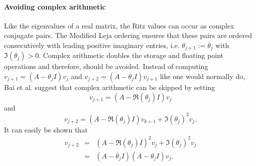 \documentclass{scrartcl}
\numberwithin{equation}{section}
\begin{document}
\paragraph{Avoiding complex arithmetic} \label{sec:avoid_compl_arithm}
Like the eigenvalues of a real matrix, the Ritz values can occur as complex conjugate pairs. The Modified Leja ordering ensures that these pairs are ordered consecutively with leading positive imaginary entries, i.e. $\theta_{j + 1} := \overline{\theta}_j$ with $\Im(\theta_j) > 0$. Complex arithmetic doubles the storage and floating point operations and therefore, should be avoided. Instead of computing $v_{j + 1} = (A - \theta_j I)v_j$ and $v_{j + 2} = (A - \overline{\theta}_j I)v_{j + 1}$ like one would normally do, Bai et al. \cite{doi:10.1093/imanum/NewtonGMRES_bai} suggest that complex arithmetic can be skipped by setting
\begin{equation}
v_{j + 1} = (A - \Re(\theta_j) I )v_j
\end{equation}
and
\begin{equation}
v_{j + 2} = (A - \Re(\theta_j) I )v_{k + 1} + \Im(\theta_j)^2 v_j.
\end{equation}
It can easily be shown that 
\begin{eqnarray*}
v_{j + 2} &=& (A - \Re(\theta_j) I )^2v_{j} + \Im(\theta_j)^2 v_j \\
&=& (A - \overline{\theta}_j I )(A - \theta_j I )v_{j}.
\end{eqnarray*}
\end{document}
